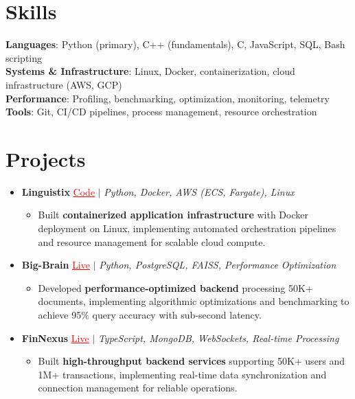\documentclass[letterpaper,10pt]{article}
\newcommand{\resumeItem}[1]{\item\small{{#1 \vspace{-2pt}}}}
\newcommand{\resumeProjectHeading}[1]{\item \small #1 \vspace{-2pt}}
\newcommand{\resumeSubHeadingListStart}{\begin{itemize}[leftmargin=0.0in, label={}]}
\newcommand{\resumeSubHeadingListEnd}{\end{itemize}}
\newcommand{\resumeProjItemListStart}{\begin{itemize}[leftmargin=0.15in,label=\textbullet,itemsep=0pt,topsep=0pt,parsep=0pt,partopsep=0pt]}
\newcommand{\resumeProjItemListEnd}{\end{itemize}\vspace{-4pt}}
\begin{document}
\section{Skills}
\begin{itemize}[leftmargin=0.15in, label={}]
\small{\item{
\textbf{Languages}: Python (primary), C++ (fundamentals), C, JavaScript, SQL, Bash scripting \\
\textbf{Systems \& Infrastructure}: Linux, Docker, containerization, cloud infrastructure (AWS, GCP) \\
\textbf{Performance}: Profiling, benchmarking, optimization, monitoring, telemetry \\
\textbf{Tools}: Git, CI/CD pipelines, process management, resource orchestration
}}
\end{itemize}
\vspace{-16pt}
\section{Projects}
\resumeSubHeadingListStart
\vspace{-2pt}
\resumeProjectHeading{\textbf{Linguistix} {\href{https://github.com/SAHAJ-BHADJA/Linguistix}{\textcolor{red}{\underline{Code}}}} $|$ \emph{Python, Docker, AWS (ECS, Fargate), Linux}}
\resumeProjItemListStart
\resumeItem{Built \textbf{containerized application infrastructure} with Docker deployment on Linux, implementing automated orchestration pipelines and resource management for scalable cloud compute.}
\resumeProjItemListEnd
\vspace{3pt}
\resumeProjectHeading{\textbf{Big-Brain} {\href{https://big-brain-pied.vercel.app/}{\textcolor{red}{\underline{Live}}}} $|$ \emph{Python, PostgreSQL, FAISS, Performance Optimization}}
\resumeProjItemListStart
\resumeItem{Developed \textbf{performance-optimized backend} processing 50K+ documents, implementing algorithmic optimizations and benchmarking to achieve 95\% query accuracy with sub-second latency.}
\resumeProjItemListEnd
\vspace{3pt}
\resumeProjectHeading{\textbf{FinNexus} {\href{https://fin-nexus.vercel.app/}{\textcolor{red}{\underline{Live}}}} $|$ \emph{TypeScript, MongoDB, WebSockets, Real-time Processing}}
\resumeProjItemListStart
\resumeItem{Built \textbf{high-throughput backend services} supporting 50K+ users and 1M+ transactions, implementing real-time data synchronization and connection management for reliable operations.}
\resumeProjItemListEnd
\resumeSubHeadingListEnd
\end{document}
